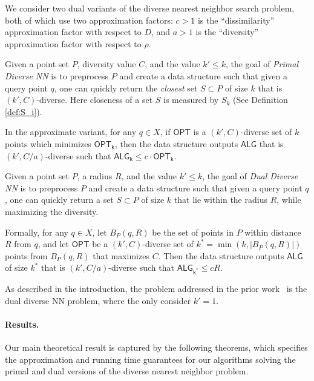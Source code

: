 We consider two dual variants of the diverse nearest neighbor search problem, both of which use two approximation factors: $c>1$ is the ``dissimilarity'' approximation factor with respect to $D$, and $a>1$ is the ``diversity'' approximation factor with respect to $\rho$.

\begin{definition}
    Given a point set $P$, diversity value $C$, and the value $k'\leq k$, the goal of {\em Primal Diverse NN} is to preprocess $P$ and create a data structure such that given a query point $q$, one can quickly return the {\em closest} set $S\subset P$ of size $k$ that is $(k',C)$-diverse. Here closeness of a set $S$ is measured by $S_k$ (See Definition \ref{def:S_i}).

    In the approximate variant, for any $q \in X$, if $\mathsf{OPT}$ is a $(k',C)$-diverse set of $k$ points which minimizes $\mathsf{OPT_k}$, then the data structure outputs $\mathsf{ALG}$ that is $(k',C/a)$-diverse such that $\mathsf{ALG_k} \le c\cdot \mathsf{OPT_k}$.
\end{definition}



\begin{definition}
    Given a point set $P$, a radius $R$, and the value $k'\leq k$, the goal of {\em Dual Diverse NN} is to preprocess $P$ and create a data structure such that given a query point $q$, one can quickly return a set $S\subset P$ of size $k$ that lie within the radius $R$, while maximizing the diversity. 

    Formally, for any $q \in X$, let $B_P(q,R)$ be the set of points in $P$ within distance $R$ from $q$, and let $\mathsf{OPT}$ be a $(k',C)$-diverse set of $k^*=\min(k,|B_P(q,R)|)$ points from $B_P(q,R)$ that maximizes $C$. Then the data structure outputs $\mathsf{ALG}$ of size $k^*$ that is $(k',C/a)$-diverse such that $\mathsf{ALG_{k^*}}\le c R$.
\end{definition}


As described in the introduction, the problem addressed in the prior work~\cite{abbar2013diverse} is the dual diverse NN problem, where the only consider $k'=1$.

\paragraph{Results.} Our main theoretical result is captured by the following theorems, which specifies the approximation and running time guarantees for our algorithms solving the primal and dual versions of the diverse nearest neighbor problem. 

